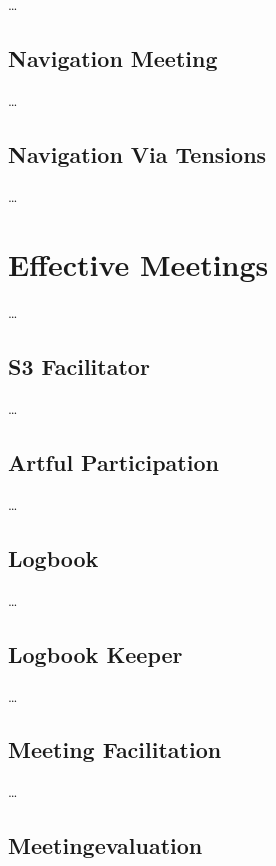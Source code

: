 {\ldots}

\section{Navigation Meeting}
\label{navigationmeeting}

{\ldots}

\section{Navigation Via Tensions}
\label{navigationviatensions}

{\ldots}

\chapter{Effective Meetings}
\label{effectivemeetings}

{\ldots}

\section{S3 Facilitator}
\label{s3facilitator}

{\ldots}

\section{Artful Participation}
\label{artfulparticipation}

{\ldots}

\section{Logbook}
\label{logbook}

{\ldots}

\section{Logbook Keeper}
\label{logbookkeeper}

{\ldots}

\section{Meeting Facilitation}
\label{meetingfacilitation}

{\ldots}

\section{Meetingevaluation}
\label{meetingevaluation}

